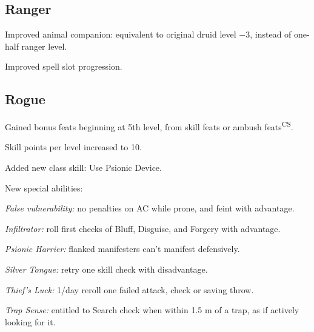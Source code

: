 
\subsection{Ranger}
\begin{itemize*}
\item Improved animal companion: equivalent to original druid level $-3$, instead of one-half ranger level.
\item Improved spell slot progression.
\end{itemize*}

\subsection{Rogue}
\begin{itemize*}
\item Gained bonus feats beginning at 5th level, from skill feats or ambush feats\textsuperscript{CS}.
\item Skill points per level increased to 10.
\item Added new class skill: Use Psionic Device.
\item New special abilities:
	\begin{itemize*}
	\item \textit{False vulnerability:} no penalties on AC while prone, and feint with advantage.
	\item \textit{Infiltrator:} roll first checks of Bluff, Disguise, and Forgery with advantage.
	\item \textit{Psionic Harrier:} flanked manifesters can't manifest defensively.
	\item \textit{Silver Tongue:} retry one skill check with disadvantage.
	\item \textit{Thief's Luck:} 1/day reroll one failed attack, check or saving throw.
	\item \textit{Trap Sense:} entitled to Search check when within 1.5 m of a trap, as if actively looking for it.
	\end{itemize*}
\end{itemize*}

